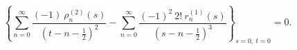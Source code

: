 \begin{equation}
\left\{
\sum_{n=0}^\infty
\frac{(-1)\ \rho_n^{(2)}(s)}{(t-n-\frac{1}{2})^2} -
\sum_{n=0}^\infty
\frac{(-1)^2\ 2!\ r_n^{(1)}(s)}{(s-n-\frac{1}{2})^3}
\right\}_{s=0,\ t=0} = 0.
\label{11}
\end{equation}

